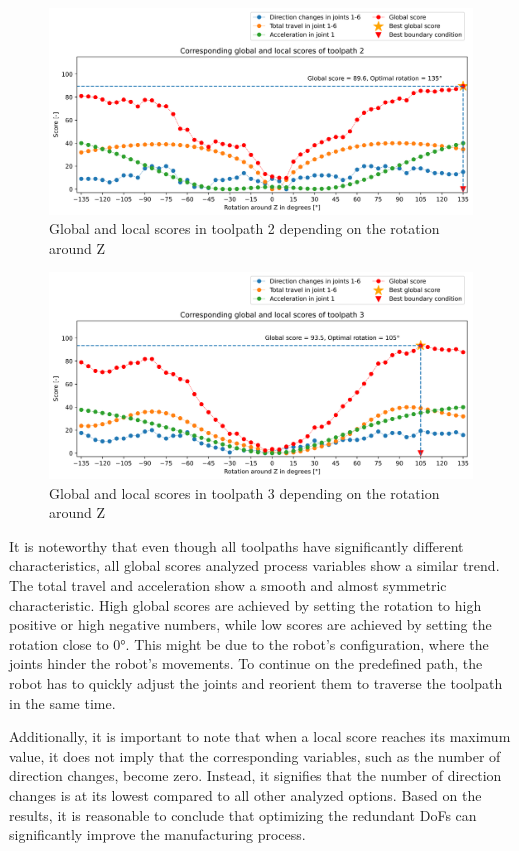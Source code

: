 \begin{figure}[H]
\centerline{\includegraphics[width=1\textwidth]{figures/best_c_2_combi.png}}
\caption{Global and local scores in toolpath 2 depending on the rotation around Z}
\label{TP2_combi}
\end{figure}
\begin{figure}[H]
\centerline{\includegraphics[width=1\textwidth]{figures/best_c_3_combi.png}}
\caption{Global and local scores in toolpath 3 depending on the rotation around Z}
\label{TP3_combi}
\end{figure}

It is noteworthy that even though all toolpaths have significantly different characteristics, all global scores analyzed process variables show a similar trend. The total travel and acceleration show a smooth and almost symmetric characteristic. High global scores are achieved by setting the rotation to high positive or high negative numbers, while low scores are achieved by setting the rotation close to 0°. This might be due to the robot's configuration, where the joints hinder the robot's movements. To continue on the predefined path, the robot has to quickly adjust the joints and reorient them to traverse the toolpath in the same time.

Additionally, it is important to note that when a local score reaches its maximum value, it does not imply that the corresponding variables, such as the number of direction changes, become zero. Instead, it signifies that the number of direction changes is at its lowest compared to all other analyzed options. Based on the results, it is reasonable to conclude that optimizing the redundant \acrshort{DoF}s can significantly improve the manufacturing process.

